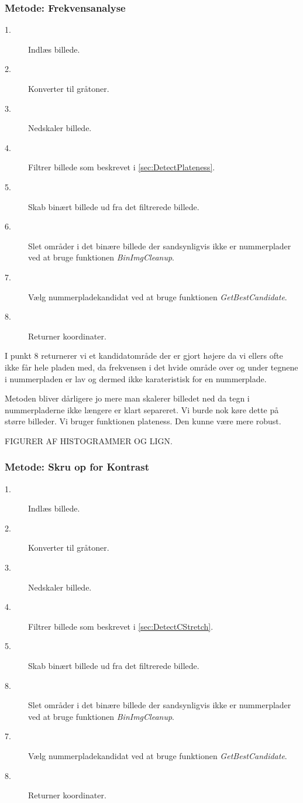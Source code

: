 \subsubsection{Metode: Frekvensanalyse}
\begin{description}
\item[1.] Indlæs billede.
\item[2.] Konverter til gråtoner.
\item[3.] Nedskaler billede.
\item[4.] Filtrer billede som beskrevet i \ref{sec:DetectPlateness}.
\item[5.] Skab binært billede ud fra det filtrerede billede.
\item[6.] Slet områder i det binære billede der sandsynligvis ikke er nummerplader ved at bruge funktionen \textit{BinImgCleanup}.
\item[7.] Vælg nummerpladekandidat ved at bruge funktionen \textit{GetBestCandidate}.
\item[8.] Returner koordinater.
\end{description}

I punkt 8 returnerer vi et kandidatområde der er gjort højere da vi ellers ofte ikke får hele pladen med, da frekvensen i det hvide område over og under tegnene i nummerpladen er lav og dermed ikke karateristisk for en nummerplade.

Metoden bliver dårligere jo mere man skalerer billedet ned da tegn i nummerpladerne ikke længere er klart separeret. Vi burde nok køre dette på større billeder.
Vi bruger funktionen plateness. Den kunne være mere robust.

FIGURER AF HISTOGRAMMER OG LIGN.


\subsubsection{Metode: Skru op for Kontrast}
\begin{description}
\item[1.] Indlæs billede.
\item[2.] Konverter til gråtoner.
\item[3.] Nedskaler billede.
\item[4.] Filtrer billede som beskrevet i \ref{sec:DetectCStretch}.
\item[5.] Skab binært billede ud fra det filtrerede billede.
\item[8.] Slet områder i det binære billede der sandsynligvis ikke er nummerplader ved at bruge funktionen \textit{BinImgCleanup}.
\item[7.] Vælg nummerpladekandidat ved at bruge funktionen \textit{GetBestCandidate}.
\item[8.] Returner koordinater.
\end{description}

